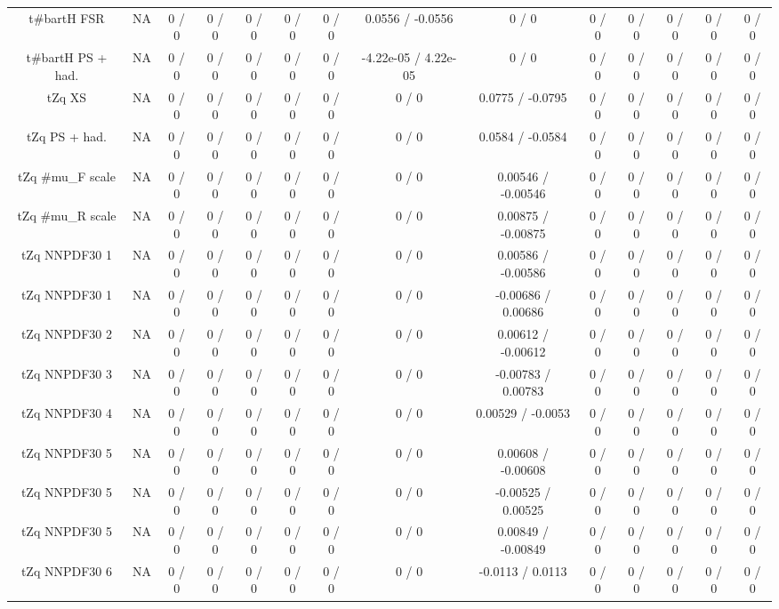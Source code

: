 \documentclass[10pt]{article}
\begin{document}
\begin{table}[htbp]
\begin{center}
\begin{tabular}{|c|c|c|c|c|c|c|c|c|c|c|c|c|c|}
  t#bar{t}H FSR &    NA    & 0 / 0 & 0 / 0 & 0 / 0 & 0 / 0 & 0 / 0 & 0.0556 / -0.0556 & 0 / 0 & 0 / 0 & 0 / 0 & 0 / 0 & 0 / 0 & 0 / 0 \\ 
  t#bar{t}H PS + had. &    NA    & 0 / 0 & 0 / 0 & 0 / 0 & 0 / 0 & 0 / 0 & -4.22e-05 / 4.22e-05 & 0 / 0 & 0 / 0 & 0 / 0 & 0 / 0 & 0 / 0 & 0 / 0 \\ 
  tZq XS &    NA    & 0 / 0 & 0 / 0 & 0 / 0 & 0 / 0 & 0 / 0 & 0 / 0 & 0.0775 / -0.0795 & 0 / 0 & 0 / 0 & 0 / 0 & 0 / 0 & 0 / 0 \\ 
  tZq PS + had. &    NA    & 0 / 0 & 0 / 0 & 0 / 0 & 0 / 0 & 0 / 0 & 0 / 0 & 0.0584 / -0.0584 & 0 / 0 & 0 / 0 & 0 / 0 & 0 / 0 & 0 / 0 \\ 
  tZq #mu_{F} scale &    NA    & 0 / 0 & 0 / 0 & 0 / 0 & 0 / 0 & 0 / 0 & 0 / 0 & 0.00546 / -0.00546 & 0 / 0 & 0 / 0 & 0 / 0 & 0 / 0 & 0 / 0 \\ 
  tZq #mu_{R} scale &    NA    & 0 / 0 & 0 / 0 & 0 / 0 & 0 / 0 & 0 / 0 & 0 / 0 & 0.00875 / -0.00875 & 0 / 0 & 0 / 0 & 0 / 0 & 0 / 0 & 0 / 0 \\ 
  tZq NNPDF30 1 &    NA    & 0 / 0 & 0 / 0 & 0 / 0 & 0 / 0 & 0 / 0 & 0 / 0 & 0.00586 / -0.00586 & 0 / 0 & 0 / 0 & 0 / 0 & 0 / 0 & 0 / 0 \\ 
  tZq NNPDF30 1 &    NA    & 0 / 0 & 0 / 0 & 0 / 0 & 0 / 0 & 0 / 0 & 0 / 0 & -0.00686 / 0.00686 & 0 / 0 & 0 / 0 & 0 / 0 & 0 / 0 & 0 / 0 \\ 
  tZq NNPDF30 2 &    NA    & 0 / 0 & 0 / 0 & 0 / 0 & 0 / 0 & 0 / 0 & 0 / 0 & 0.00612 / -0.00612 & 0 / 0 & 0 / 0 & 0 / 0 & 0 / 0 & 0 / 0 \\ 
  tZq NNPDF30 3 &    NA    & 0 / 0 & 0 / 0 & 0 / 0 & 0 / 0 & 0 / 0 & 0 / 0 & -0.00783 / 0.00783 & 0 / 0 & 0 / 0 & 0 / 0 & 0 / 0 & 0 / 0 \\ 
  tZq NNPDF30 4 &    NA    & 0 / 0 & 0 / 0 & 0 / 0 & 0 / 0 & 0 / 0 & 0 / 0 & 0.00529 / -0.0053 & 0 / 0 & 0 / 0 & 0 / 0 & 0 / 0 & 0 / 0 \\ 
  tZq NNPDF30 5 &    NA    & 0 / 0 & 0 / 0 & 0 / 0 & 0 / 0 & 0 / 0 & 0 / 0 & 0.00608 / -0.00608 & 0 / 0 & 0 / 0 & 0 / 0 & 0 / 0 & 0 / 0 \\ 
  tZq NNPDF30 5 &    NA    & 0 / 0 & 0 / 0 & 0 / 0 & 0 / 0 & 0 / 0 & 0 / 0 & -0.00525 / 0.00525 & 0 / 0 & 0 / 0 & 0 / 0 & 0 / 0 & 0 / 0 \\ 
  tZq NNPDF30 5 &    NA    & 0 / 0 & 0 / 0 & 0 / 0 & 0 / 0 & 0 / 0 & 0 / 0 & 0.00849 / -0.00849 & 0 / 0 & 0 / 0 & 0 / 0 & 0 / 0 & 0 / 0 \\ 
  tZq NNPDF30 6 &    NA    & 0 / 0 & 0 / 0 & 0 / 0 & 0 / 0 & 0 / 0 & 0 / 0 & -0.0113 / 0.0113 & 0 / 0 & 0 / 0 & 0 / 0 & 0 / 0 & 0 / 0 \\ 

\end{tabular}
\end{center}
\end{table}
\end{document}
